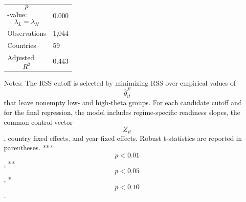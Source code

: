 \begin{table}[H]
\begin{threeparttable}
\begin{tabularx}{\textwidth}{lY}
$$p$$-value: $$\lambda_L=\lambda_H$$ & 0.000 \\
Observations & 1,044 \\
Countries & 59 \\
Adjusted $$R^2$$ & 0.443 \\
\bottomrule
\end{tabularx}
\begin{tablenotes}[flushleft]\footnotesize
\item Notes: The RSS cutoff is selected by minimizing RSS over empirical values of $$\widehat{\theta}^{F}_{it}$$ that leave nonempty low- and high-theta groups. For each candidate cutoff and for the final regression, the model includes regime-specific readiness slopes, the common control vector $$Z_{it}$$, country fixed effects, and year fixed effects. Robust t-statistics are reported in parentheses. *** $$p<0.01$$, ** $$p<0.05$$, * $$p<0.10$$.
\end{tablenotes}
\end{threeparttable}
\end{table}
